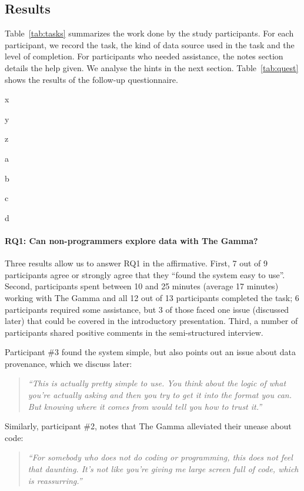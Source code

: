 \documentclass[manuscript,review,anonymous]{acmart}
\begin{document}
\subsection{Results}
Table~\ref{tab:tasks} summarizes the work done by the study participants.
For each participant, we record the task, the kind of data source used in the task and the
level of completion. For participants who needed assistance, the notes section details the help
given. We analyse the hints in the next section. Table~\ref{tab:quest} shows the results of the
follow-up questionnaire.

x

y

z

a

b

c

d

\paragraph{RQ1: Can non-programmers explore data with The Gamma?}
Three results allow us to answer RQ1 in the affirmative. First, 7 out of 9
participants agree or strongly agree that they ``found the system easy to use''. Second,
participants spent between 10 and 25 minutes (average 17 minutes) working with The Gamma and
all 12 out of 13 participants completed the task; 6 participants required some assistance,
but 3 of those faced one issue (discussed later) that could be covered in the introductory
presentation. Third, a number of participants shared positive comments in the semi-structured
interview.

Participant \#3 found the system simple, but also points out an issue about data provenance,
which we discuss later:

\begin{quote}
\emph{``This is actually pretty simple to use. You think about the logic of what you're actually
  asking and then you try to get it into the format you can. But knowing where it comes from
  would tell you how to trust it.''}
\end{quote}

Similarly, participant \#2, notes that The Gamma alleviated their unease about code:

\begin{quote}
\emph{``For somebody who does not do coding or programming, this does not feel that daunting.
  It's not like you're giving me large screen full of code, which is reassurring.''}
\end{quote}
\end{document}
